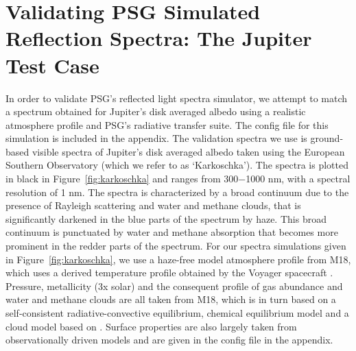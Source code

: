 \documentclass[12pt, letterpaper]{aastex631}
\begin{document}

\section{Validating PSG Simulated Reflection Spectra: The Jupiter Test Case} \label{subsec:validation}

In order to validate PSG's reflected light spectra simulator, we attempt to match a spectrum obtained for Jupiter's disk averaged albedo using a realistic atmosphere profile and PSG's radiative transfer suite.  The config file for this simulation is included in the appendix.  The validation spectra we use is ground-based visible spectra of Jupiter's disk averaged albedo taken using the European Southern Observatory \citep{1994Icar..111..174K} (which we refer to as `Karkoschka'). The spectra is plotted in black in Figure~\ref{fig:karkoschka} and ranges from 300$-$1000 nm, with a spectral resolution of 1 nm. The spectra is characterized by a broad continuum due to the presence of Rayleigh scattering and water and methane clouds, that is significantly darkened in the blue parts of the spectrum by haze. This broad continuum is punctuated by water and methane absorption that becomes more prominent in the redder parts of the spectrum. 
For our spectra simulations given in Figure~\ref{fig:karkoschka}, we use a haze-free model atmosphere profile from M18, which uses a derived temperature profile obtained by the Voyager spacecraft \citep{1981JGR....86.8721L}.   Pressure, metallicity (3x solar) and the consequent profile of gas abundance and water and methane clouds are all taken from M18, which is in turn based on a self-consistent radiative-convective equilibrium, chemical equilibrium model and a cloud model based on \textcite{2001ApJ...556..872A}. 
Surface properties are also largely taken from observationally driven models \citep{1981JGR....86.8721L, doi:10.1029/2005JE002411} and are given in the config file in the appendix.
\end{document}
